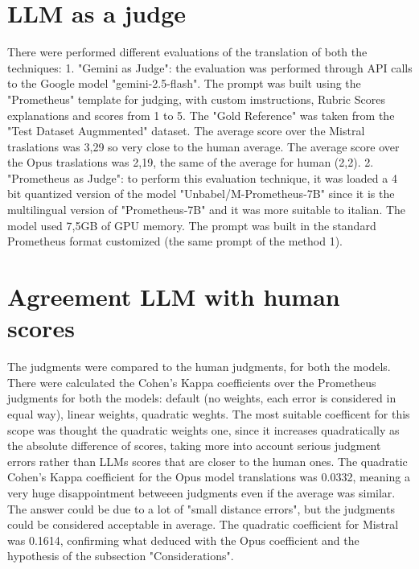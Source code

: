\documentclass{article}
\begin{document}
\section{LLM as a judge} 
There were performed different evaluations of the translation of both the techniques: 1. "Gemini as Judge": the evaluation was performed through API calls to the Google model "gemini-2.5-flash". The prompt was built using the "Prometheus" template for judging, with custom imstructions, Rubric Scores explanations and scores from 1 to 5. The "Gold Reference" was taken from the "Test Dataset Augmmented" dataset. The average score over the Mistral traslations was 3,29 so very close to the human average. The average score over the Opus traslations was 2,19, the same of the average for human (2,2). 2. "Prometheus as Judge": to perform this evaluation technique, it was loaded a 4 bit quantized version of the model "Unbabel/M-Prometheus-7B" since it is the multilingual version of "Prometheus‑7B" and it was more suitable to italian. The model used 7,5GB of GPU memory. The prompt was built in the standard Prometheus format customized (the same prompt of the method 1).


\section{Agreement LLM with human scores} 
The judgments were compared to the human judgments, for both the models. There were calculated the Cohen's Kappa coefficients over the Prometheus judgments for both the models: default (no weights, each error is considered in equal way), linear weights, quadratic weghts. The most suitable coefficent for this scope was thought the quadratic weights one, since it increases quadratically as the absolute difference of scores, taking more into account serious judgment errors rather than LLMs scores that are closer to the human ones. The quadratic Cohen's Kappa coefficient for the Opus model translations was 0.0332, meaning a very huge disappointment betweeen judgments even if the average was similar. The answer could be due to a lot of "small distance errors", but the judgments could be considered acceptable in average. The quadratic coefficient for Mistral was 0.1614, confirming what deduced with the Opus coefficient and the hypothesis of the subsection "Considerations".



\end{document}
